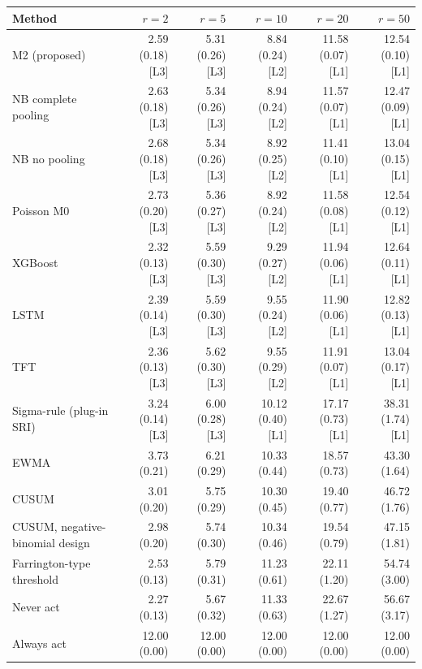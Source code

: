 \noindent\begin{minipage}{\linewidth}
\label{tab:S19.2}
\centering\scriptsize
\begin{tabular}{lrrrrr}
\toprule
Method & $r = 2$ & $r = 5$ & $r = 10$ & $r = 20$ & $r = 50$ \\ \midrule
M2 (proposed) & 2.59 (0.18) [L3] & 5.31 (0.26) [L3] & 8.84 (0.24) [L2] & 11.58 (0.07) [L1] & 12.54 (0.10) [L1] \\
NB complete pooling & 2.63 (0.18) [L3] & 5.34 (0.26) [L3] & 8.94 (0.24) [L2] & 11.57 (0.07) [L1] & 12.47 (0.09) [L1] \\
NB no pooling & 2.68 (0.18) [L3] & 5.34 (0.26) [L3] & 8.92 (0.25) [L2] & 11.41 (0.10) [L1] & 13.04 (0.15) [L1] \\
Poisson M0 & 2.73 (0.20) [L3] & 5.36 (0.27) [L3] & 8.92 (0.24) [L2] & 11.58 (0.08) [L1] & 12.54 (0.12) [L1] \\
XGBoost & 2.32 (0.13) [L3] & 5.59 (0.30) [L3] & 9.29 (0.27) [L2] & 11.94 (0.06) [L1] & 12.64 (0.11) [L1] \\
LSTM & 2.39 (0.14) [L3] & 5.59 (0.30) [L3] & 9.55 (0.24) [L2] & 11.90 (0.06) [L1] & 12.82 (0.13) [L1] \\
TFT & 2.36 (0.13) [L3] & 5.62 (0.30) [L3] & 9.55 (0.29) [L2] & 11.91 (0.07) [L1] & 13.04 (0.17) [L1] \\
Sigma-rule (plug-in SRI) & 3.24 (0.14) [L3] & 6.00 (0.28) [L3] & 10.12 (0.40) [L1] & 17.17 (0.73) [L1] & 38.31 (1.74) [L1] \\
EWMA & 3.73 (0.21) & 6.21 (0.29) & 10.33 (0.44) & 18.57 (0.73) & 43.30 (1.64) \\
CUSUM & 3.01 (0.20) & 5.75 (0.29) & 10.30 (0.45) & 19.40 (0.77) & 46.72 (1.76) \\
CUSUM, negative-binomial design & 2.98 (0.20) & 5.74 (0.30) & 10.34 (0.46) & 19.54 (0.79) & 47.15 (1.81) \\
Farrington-type threshold & 2.53 (0.13) & 5.79 (0.31) & 11.23 (0.61) & 22.11 (1.20) & 54.74 (3.00) \\
Never act & 2.27 (0.13) & 5.67 (0.32) & 11.33 (0.63) & 22.67 (1.27) & 56.67 (3.17) \\
Always act & 12.00 (0.00) & 12.00 (0.00) & 12.00 (0.00) & 12.00 (0.00) & 12.00 (0.00) \\
\bottomrule
\end{tabular}
\end{minipage}
\vspace{14pt}

